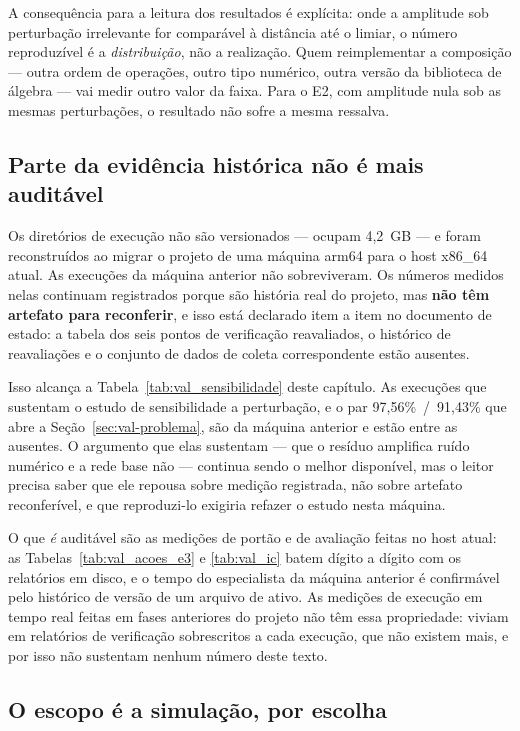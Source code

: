 A consequência para a leitura dos resultados é explícita: onde a amplitude sob
perturbação irrelevante for comparável à distância até o limiar, o número
reproduzível é a \textit{distribuição}, não a realização. Quem reimplementar a
composição --- outra ordem de operações, outro tipo numérico, outra versão da
biblioteca de álgebra --- vai medir outro valor da faixa. Para o E2, com
amplitude nula sob as mesmas perturbações, o resultado não sofre a mesma
ressalva.

\subsection{Parte da evidência histórica não é mais auditável}

Os diretórios de execução não são versionados --- ocupam 4,2~GB --- e foram
reconstruídos ao migrar o projeto de uma máquina arm64 para o host x86\_64 atual.
As execuções da máquina anterior não sobreviveram. Os números medidos nelas
continuam registrados porque são história real do projeto, mas \textbf{não têm
artefato para reconferir}, e isso está declarado item a item no documento de
estado: a tabela dos seis pontos de verificação reavaliados, o histórico de
reavaliações e o conjunto de dados de coleta correspondente estão ausentes.

Isso alcança a Tabela~\ref{tab:val_sensibilidade} deste capítulo. As
execuções que sustentam o estudo de sensibilidade a perturbação, e o par
97,56\%~/~91,43\% que abre a Seção~\ref{sec:val-problema}, são da máquina
anterior e estão entre as ausentes. O argumento que elas sustentam --- que o
resíduo amplifica ruído numérico e a rede base não --- continua sendo o melhor
disponível, mas o leitor precisa saber que ele repousa sobre medição registrada,
não sobre artefato reconferível, e que reproduzi-lo exigiria refazer o estudo
nesta máquina.

O que \textit{é} auditável são as medições de portão e de avaliação feitas no
host atual: as Tabelas~\ref{tab:val_acoes_e3} e \ref{tab:val_ic} batem dígito a
dígito com os relatórios em disco, e o tempo do especialista da máquina anterior
é confirmável pelo histórico de versão de um arquivo de ativo. As
medições de execução em tempo real feitas em fases anteriores do projeto não
têm essa propriedade: viviam em relatórios de verificação sobrescritos a cada
execução, que não existem mais, e por isso não sustentam nenhum número deste
texto.

\subsection{O escopo é a simulação, por escolha}\label{sec:val-escopo-simulacao}

